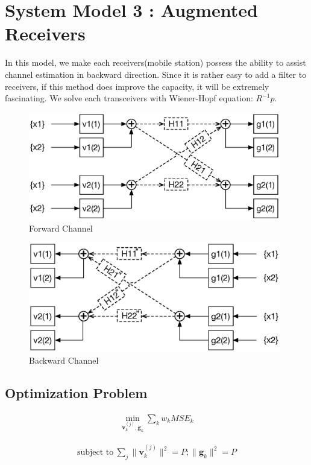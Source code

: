 \documentclass[11pt, oneside]{article}   	%
\begin{document}
\newpage

\section{System Model 3 : Augmented Receivers}
In this model, we make each receivers(mobile station) possess the ability to assist channel estimation in backward direction. Since it is rather easy to add a filter to receivers, if this method does improve the capacity, it will be extremely fascinating. We solve each transceivers with Wiener-Hopf equation: $R^{-1}p$.

 \begin{figure}[h]
    \centering
    \centerline{\includegraphics[width=110mm]{forward_channel_3}}
    \caption{Forward Channel}
\end{figure} 

\begin{figure}[h]
    \centering
    \centerline{\includegraphics[width=110mm]{backward_channel_3}}
    \caption{Backward Channel}
\end{figure} 

\subsection{Optimization Problem}
\begin{align*}
\min_{\textbf{v}_{k}^{(j)} ,\textbf{g}_{k}} \displaystyle\sum_{k} 	w_k	MSE_{k}	
\end{align*}

\begin{align*}
\text{subject to}  \ \displaystyle\sum_{j}	\|	\textbf{v}^{(j)}_{k}	\|^{2} = P; \| \textbf{g}_{k}	\|^{2} = P
\end{align*}
\end{document}
